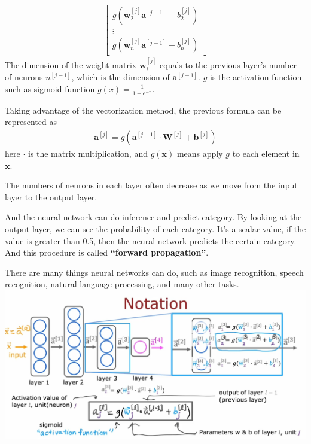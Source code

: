 \begin{notebox}
\begin{align}
\begin{bmatrix}
            g(\mathbf{w}_2^{[j]}\mathbf{a}^{[j-1]} + b_2^{[j]})\\
            \vdots \\
            g(\mathbf{w}_n^{[j]}\mathbf{a}^{[j-1]} + b_n^{[j]})
        \end{bmatrix}
    \end{align}
    \hspace{2em}The dimension of the weight matrix $\mathbf{w}_i^{[j]}$ equals to the previous layer's number
    of neurons $n^{[j - 1]}$, which is the dimension of $\mathbf{a}^{[j - 1]}$.
    $g$ is the activation function such as sigmoid function $g(x) = \frac{1}{1+e^{-x}}$.\par
    \hspace{2em}Taking advantage of the vectorization method, the previous formula can be represented as
    \begin{align}
        \mathbf{a}^{[j]} =  g(\mathbf{a}^{[j - 1]} \cdot \mathbf{W}^{[j]} + \mathbf{b}^{[j]})
    \end{align}
    \hspace{2em} here $\cdot$ is the matrix multiplication, and $g(\mathbf{x})$ means apply $g$ to each element
    in $\mathbf{x}$. 
\end{notebox}
\par
The numbers of neurons in each layer often decrease as we move from the input layer to the output layer.
\par
And the neural network can do inference and predict category.
By looking at the output layer, we can see the probability of each category.
It's a scalar value, if the value is greater than 0.5, then the neural network predicts the certain category.
And this procedure is called \textbf{``forward propagation''}.\par
There are many things neural networks can do, such as image recognition, speech recognition, natural language processing, and many other tasks.\\
\includegraphics[width=\textwidth]{images/8.2}

